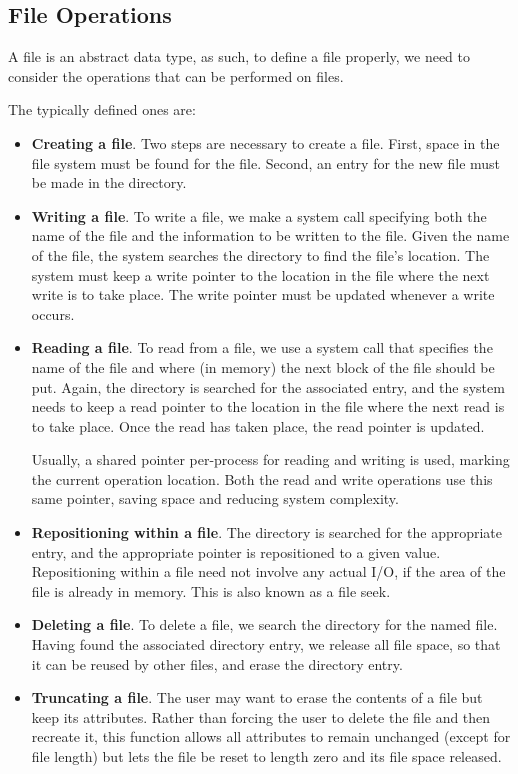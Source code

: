 \subsection{File Operations}\label{subsec:File_Operations}
A file is an abstract data type, as such, to define a file properly, we need to consider the operations that can be performed on files.

The typically defined ones are:
\begin{itemize}[noitemsep]
\item \textbf{Creating a file}.
  Two steps are necessary to create a file.
  First, space in the file system must be found for the file.
  Second, an entry for the new file must be made in the directory.

\item \textbf{Writing a file}.
  To write a file, we make a system call specifying both the name of the file and the information to be written to the file.
  Given the name of the file, the system searches the directory to find the file’s location.
  The system must keep a write pointer to the location in the file where the next write is to take place.
  The write pointer must be updated whenever a write occurs.

\item \textbf{Reading a file}.
  To read from a file, we use a system call that specifies the name of the file and where (in memory) the next block of the file should be put.
  Again, the directory is searched for the associated entry, and the system needs to keep a read pointer to the location in the file where the next read is to take place.
  Once the read has taken place, the read pointer is updated.

  Usually, a shared pointer per-process for reading and writing is used, marking the current operation location.
  Both the read and write operations use this same pointer, saving space and reducing system complexity.

\item \textbf{Repositioning within a file}.
  The directory is searched for the appropriate entry, and the appropriate pointer is repositioned to a given value.
  Repositioning within a file need not involve any actual I/O, if the area of the file is already in memory.
  This is also known as a file seek.

\item \textbf{Deleting a file}.
  To delete a file, we search the directory for the named file.
  Having found the associated directory entry, we release all file space, so that it can be reused by other files, and erase the directory entry.

\item \textbf{Truncating a file}.
  The user may want to erase the contents of a file but keep its attributes.
  Rather than forcing the user to delete the file and then recreate it, this function allows all attributes to remain unchanged (except for file length) but lets the file be reset to length zero and its file space released.
\end{itemize}


